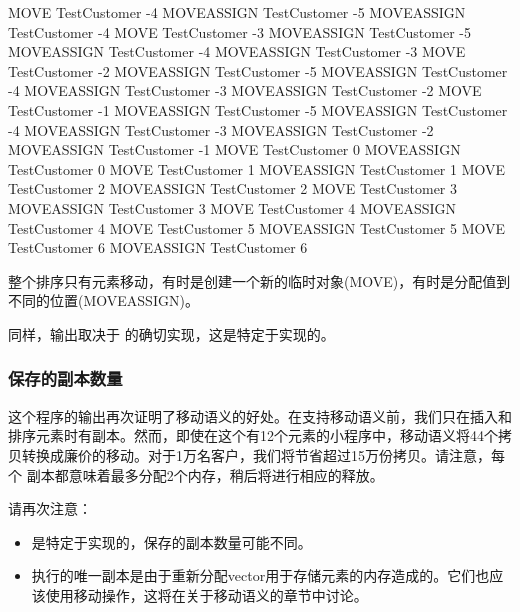 \begin{outputcode}
MOVE TestCustomer -4
MOVEASSIGN TestCustomer -5
MOVEASSIGN TestCustomer -4
MOVE TestCustomer -3
MOVEASSIGN TestCustomer -5
MOVEASSIGN TestCustomer -4
MOVEASSIGN TestCustomer -3
MOVE TestCustomer -2
MOVEASSIGN TestCustomer -5
MOVEASSIGN TestCustomer -4
MOVEASSIGN TestCustomer -3
MOVEASSIGN TestCustomer -2
MOVE TestCustomer -1
MOVEASSIGN TestCustomer -5
MOVEASSIGN TestCustomer -4
MOVEASSIGN TestCustomer -3
MOVEASSIGN TestCustomer -2
MOVEASSIGN TestCustomer -1
MOVE TestCustomer 0
MOVEASSIGN TestCustomer 0
MOVE TestCustomer 1
MOVEASSIGN TestCustomer 1
MOVE TestCustomer 2
MOVEASSIGN TestCustomer 2
MOVE TestCustomer 3
MOVEASSIGN TestCustomer 3
MOVE TestCustomer 4
MOVEASSIGN TestCustomer 4
MOVE TestCustomer 5
MOVEASSIGN TestCustomer 5
MOVE TestCustomer 6
MOVEASSIGN TestCustomer 6
\end{outputcode}

整个排序只有元素移动，有时是创建一个新的临时对象(MOVE)，有时是分配值到不同的位置(MOVEASSIGN)。

同样，输出取决于  的确切实现，这是特定于实现的。

\subsubsection{保存的副本数量}

这个程序的输出再次证明了移动语义的好处。在支持移动语义前，我们只在插入和排序元素时有副本。然而，即使在这个有12个元素的小程序中，移动语义将44个拷贝转换成廉价的移动。对于1万名客户，我们将节省超过15万份拷贝。请注意，每个  副本都意味着最多分配2个内存，稍后将进行相应的释放。

请再次注意：

\begin{itemize}
	\item {} 是特定于实现的，保存的副本数量可能不同。
	\item 执行的唯一副本是由于重新分配vector用于存储元素的内存造成的。它们也应该使用移动操作，这将在关于移动语义的章节中讨论。
\end{itemize}

























